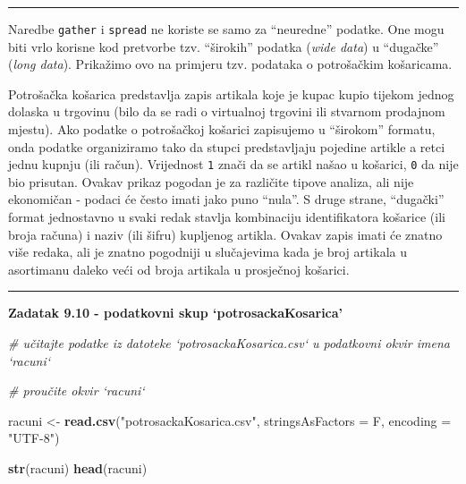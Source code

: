 \documentclass[]{book}
\newenvironment{Shaded}{\begin{snugshade}}{\end{snugshade}}
\newcommand{\KeywordTok}[1]{\textcolor[rgb]{0.13,0.29,0.53}{\textbf{#1}}}
\newcommand{\DataTypeTok}[1]{\textcolor[rgb]{0.13,0.29,0.53}{#1}}
\newcommand{\StringTok}[1]{\textcolor[rgb]{0.31,0.60,0.02}{#1}}
\newcommand{\CommentTok}[1]{\textcolor[rgb]{0.56,0.35,0.01}{\textit{#1}}}
\newcommand{\NormalTok}[1]{#1}
\theoremstyle{definition}
\theoremstyle{definition}
\theoremstyle{definition}
\theoremstyle{remark}
\begin{document}
\begin{center}\rule{0.5\linewidth}{\linethickness}\end{center}

Naredbe \texttt{gather} i \texttt{spread} ne koriste se samo za
``neuredne'' podatke. One mogu biti vrlo korisne kod pretvorbe tzv.
``širokih'' podatka (\emph{wide data}) u ``dugačke'' (\emph{long data}).
Prikažimo ovo na primjeru tzv. podataka o potrošačkim košaricama.

Potrošačka košarica predstavlja zapis artikala koje je kupac kupio
tijekom jednog dolaska u trgovinu (bilo da se radi o virtualnoj trgovini
ili stvarnom prodajnom mjestu). Ako podatke o potrošačkoj košarici
zapisujemo u ``širokom'' formatu, onda podatke organiziramo tako da
stupci predstavljaju pojedine artikle a retci jednu kupnju (ili račun).
Vrijednost \texttt{1} znači da se artikl našao u košarici, \texttt{0} da
nije bio prisutan. Ovakav prikaz pogodan je za različite tipove analiza,
ali nije ekonomičan - podaci će često imati jako puno ``nula''. S druge
strane, ``dugački'' format jednostavno u svaki redak stavlja kombinaciju
identifikatora košarice (ili broja računa) i naziv (ili šifru) kupljenog
artikla. Ovakav zapis imati će znatno više redaka, ali je znatno
pogodniji u slučajevima kada je broj artikala u asortimanu daleko veći
od broja artikala u prosječnoj košarici.

\begin{center}\rule{0.5\linewidth}{\linethickness}\end{center}

\textbf{Zadatak 9.10 - podatkovni skup `potrosackaKosarica'}

\begin{Shaded}
\begin{Highlighting}[]
\CommentTok{# učitajte podatke iz datoteke `potrosackaKosarica.csv` u podatkovni okvir imena `racuni`}

\CommentTok{# proučite okvir `racuni`}
\end{Highlighting}
\end{Shaded}

\begin{Shaded}
\begin{Highlighting}[]
\NormalTok{racuni <-}\StringTok{ }\KeywordTok{read.csv}\NormalTok{(}\StringTok{"potrosackaKosarica.csv"}\NormalTok{, }\DataTypeTok{stringsAsFactors =}\NormalTok{ F, }\DataTypeTok{encoding =} \StringTok{"UTF-8"}\NormalTok{)}

\KeywordTok{str}\NormalTok{(racuni)}
\KeywordTok{head}\NormalTok{(racuni)}
\end{Highlighting}
\end{Shaded}
\end{document}
